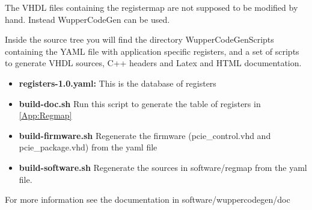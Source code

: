 The VHDL files containing the registermap are not supposed to be modified by hand. Instead WupperCodeGen can be used.

Inside the source tree you will find the directory WupperCodeGenScripts containing the YAML file with application specific registers, and a set of scripts to generate VHDL sources, C++ headers and Latex and HTML documentation.
\begin{itemize}
	\item \textbf{registers-1.0.yaml: }This is the database of registers 
	\item \textbf{build-doc.sh }Run this script to generate the table of registers in \ref{App:Regmap}
	\item \textbf{build-firmware.sh }Regenerate the firmware (pcie\_control.vhd and pcie\_package.vhd) from the yaml file
	\item \textbf{build-software.sh }Regenerate the sources in software/regmap from the yaml file.

\end{itemize}

For more information see the documentation in software/wuppercodegen/doc

\newpage